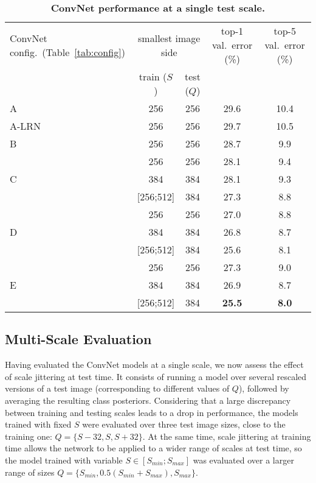\documentclass{article} %
\newcommand{\tblref}[1]{Table~\ref{#1}}
\begin{document}
\begin{table}[htb]
\small
\centering
\caption{\textbf{ConvNet performance at a single test scale.}
}
\begin{tabular}{|l|c|c|c|c|} \hline
ConvNet config.\ (\tblref{tab:config}) & \multicolumn{2}{c|}{smallest image side} & top-1 val.\ error (\%) & top-5 val.\ error (\%) \\ \cline{2-3}
& train ($S$) & test ($Q$) & & \\ \hline
A & 256 & 256 & 29.6 & 10.4  \\ \hline
A-LRN & 256 & 256 & 29.7 & 10.5  \\ \hline
B & 256 & 256 & 28.7 & 9.9  \\ \hline
\multirow{3}{*}{C} & 256 & 256 & 28.1 & 9.4  \\ \cline{2-5}
 & 384 & 384 & 28.1 & 9.3  \\ \cline{2-5}
 & [256;512] & 384 & 27.3  & 8.8  \\ \hline
 \multirow{3}{*}{D} & 256 & 256 & 27.0  & 8.8  \\ \cline{2-5}
 & 384 & 384 & 26.8  & 8.7  \\ \cline{2-5}
 & [256;512] & 384 & 25.6  & 8.1  \\ \hline
 \multirow{3}{*}{E} & 256 & 256 & 27.3  & 9.0  \\ \cline{2-5}
 & 384 & 384 & 26.9  & 8.7  \\ \cline{2-5}
 & [256;512] & 384 & \textbf{25.5}  & \textbf{8.0}  \\ \hline
\end{tabular}
\label{tab:results_single_scale}
\end{table}

\subsection{Multi-Scale Evaluation}
\label{sec:multi-scale}

Having evaluated the ConvNet models at a single scale, we now assess the effect of scale jittering at test time.
It consists of running a model over several rescaled versions of a test image (corresponding to different values of $Q$), followed by averaging the resulting class posteriors.
Considering that a large discrepancy between training and testing scales leads to a drop in performance, the models trained with fixed $S$ were evaluated over 
three test image sizes, close to the training one: $Q=\{S-32, S, S+32\}$. 
At the same time, scale jittering at training time allows the network to be applied to a wider range of scales at test time, so the model trained
with variable $S \in [S_{min}; S_{max}]$ was evaluated over a larger range of sizes $Q=\{S_{min}, 0.5(S_{min} + S_{max}), S_{max}\}$. 
\end{document}
